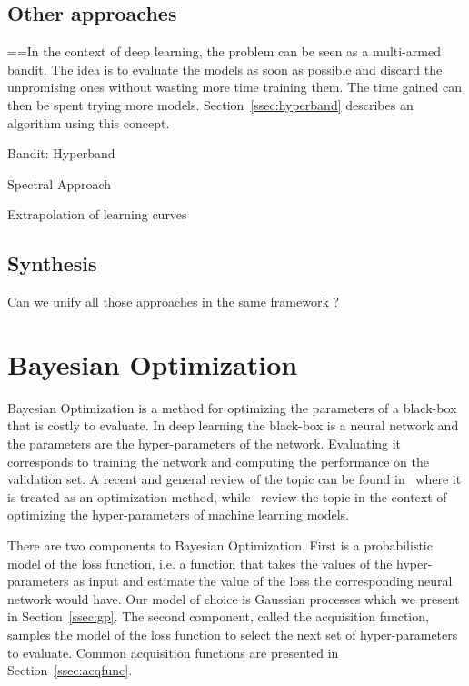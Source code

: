 \subsection{Other approaches}

==In the context of deep learning, the problem can be seen as a multi-armed bandit. The idea is to evaluate the models as soon as possible and discard the unpromising ones without wasting more time training them. The time gained can then be spent trying more models. Section~\ref{ssec:hyperband} describes an algorithm using this concept.

Bandit: Hyperband~\textcite{li2017ICLR}

Spectral Approach~\textcite{hazan2018ICLR}

Extrapolation of learning curves

\subsection{Synthesis}

Can we unify all those approaches in the same framework ?

\section{Bayesian Optimization}
\label{sec:bo}

Bayesian Optimization is a method for optimizing the parameters of a black-box that is costly to evaluate. In deep learning the black-box is a neural network and the parameters are the hyper-parameters of the network. Evaluating it corresponds to training the network and computing the performance on the validation set. A recent and general review of the topic can be found in~\textcite{shahriari2016IEEE} where it is treated as an optimization method, while~\textcite{snoek2012NIPS} review the topic in the context of optimizing the hyper-parameters of machine learning models.

There are two components to Bayesian Optimization. First is a probabilistic model of the loss function, i.e. a function that takes the values of the hyper-parameters as input and estimate the value of the loss the corresponding neural network would have. Our model of choice is Gaussian processes which we present in Section~\ref{ssec:gp}. The second component, called the acquisition function, samples the model of the loss function to select the next set of hyper-parameters to evaluate. Common acquisition functions are presented in Section~\ref{ssec:acqfunc}.

